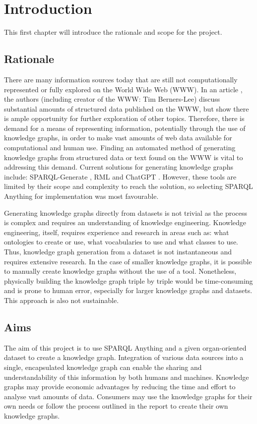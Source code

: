 \chapter{Introduction}
This first chapter will introduce the rationale and scope for the project.

\section{Rationale}
There are many information sources today that are still not computationally represented or fully explored on the World Wide Web (WWW). In an article \cite{bizer2011linked}, the authors (including creator of the WWW: Tim Berners-Lee) discuss substantial amounts of structured data published on the WWW, but show there is ample opportunity for further exploration of other topics. Therefore, there is demand for a means of representing information, potentially through the use of knowledge graphs, in order to make vast amounts of web data available for computational and human use. Finding an automated method of generating knowledge graphs from structured data or text found on the WWW is vital to addressing this demand. Current solutions for generating knowledge graphs include: SPARQL-Generate \cite{sparqlgenerate}, RML \cite{rml} and ChatGPT \cite{chatgptwebsite}. However, these tools are limited by their scope and complexity to reach the solution, so selecting SPARQL Anything \cite{sparqlanythinggithub} for implementation was most favourable. 

Generating knowledge graphs directly from datasets is not trivial as the process is complex and requires an understanding of knowledge engineering. Knowledge engineering, itself, requires experience and research in areas such as: what ontologies to create or use, what vocabularies to use and what classes to use. Thus, knowledge graph generation from a dataset is not instantaneous and requires extensive research. In the case of smaller knowledge graphs, it is possible to manually create knowledge graphs without the use of a tool. Nonetheless, physically building the knowledge graph triple by triple would be time-consuming and is prone to human error, especially for larger knowledge graphs and datasets. This approach is also not sustainable. 

\section{Aims}
The aim of this project is to use SPARQL Anything and a given organ-oriented dataset to create a knowledge graph. Integration of various data sources into a single, encapsulated knowledge graph can enable the sharing and understandability of this information by both humans and machines. Knowledge graphs may provide economic advantages by reducing the time and effort to analyse vast amounts of data. Consumers may use the knowledge graphs for their own needs or follow the process outlined in the report to create their own knowledge graphs.

